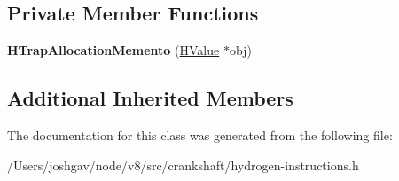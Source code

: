 \subsection*{Private Member Functions}
\begin{DoxyCompactItemize}
\item 
{\bfseries H\+Trap\+Allocation\+Memento} (\hyperlink{classv8_1_1internal_1_1_h_value}{H\+Value} $\ast$obj)\hypertarget{classv8_1_1internal_1_1_h_trap_allocation_memento_a79657dcca3e902729f6641cf73ea35cc}{}\label{classv8_1_1internal_1_1_h_trap_allocation_memento_a79657dcca3e902729f6641cf73ea35cc}

\end{DoxyCompactItemize}
\subsection*{Additional Inherited Members}


The documentation for this class was generated from the following file\+:\begin{DoxyCompactItemize}
\item 
/\+Users/joshgav/node/v8/src/crankshaft/hydrogen-\/instructions.\+h\end{DoxyCompactItemize}
